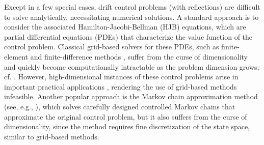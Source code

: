 \documentclass[11pt]{article}
\theoremstyle{definition}
\theoremstyle{plain}
\begin{document}
Except in a few special cases, drift control problems (with reflections) are difficult to solve analytically, 
necessitating numerical solutions. 
A standard approach is to consider the associated Hamilton-Jacobi-Bellman (HJB) equations, 
which are partial differential equations (PDEs) that characterize the value function of the control problem.
Classical grid-based solvers for these PDEs, such as finite-element and finite-difference methods \cite{thomas2013numerical,axelsson2001finite}, 
suffer from the curse of dimensionality and quickly become computationally intractable as the problem dimension grows; cf. \cite{Bellman1957,Judd1998}. 
However, high-dimensional instances of these control problems arise in important practical applications \cite{HanJentzenE2018PNAS,Atar2005,AtaHarrisonSi2024}, 
rendering the use of grid-based methods infeasible.
Another popular approach is the Markov chain approximation method (see, e.g., \cite{KushnerDupuis2001}), 
which solves carefully designed controlled Markov chains that approximate the original control problem,
but it also suffers from the curse of dimensionality, since the method requires fine discretization of the state space, similar to grid-based methods.
\end{document}
